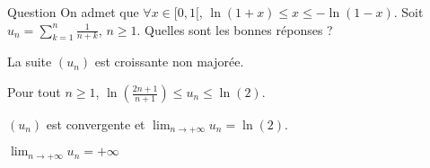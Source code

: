 \begin{multi}[multiple,feedback=
{Avec \(\displaystyle x=\frac{1}{n+k}\), on aura :
\[\ln(n+k+1)-\ln (n+k)\leq \frac{1}{n+k}\leq \ln(n+k)-\ln (n+k-1).\]
On somme sur \(k\) de \(1\) à \(n\), on obtient :
\[\ln \left(\frac{2n+1}{n+1}\right)\leq u_n\leq \ln (2n)-\ln (n)=\ln (2).\]
Le théorème d'encadrement implique que \((u_n)\) converge et que sa limite est \(\ln (2)\).
}]{Question}
On admet que \(\forall x \in [0,1[\), \(\ln (1+x)\leq x\leq -\ln (1-x)\). Soit \(\displaystyle u_n=\sum _{k=1}^n\frac{1}{n+k}\), \(n\geq 1\). Quelles sont les bonnes réponses ?

    \item La suite \((u_n)\) est croissante non majorée.
    \item* Pour tout \(n\geq 1\), \(\displaystyle \ln \left(\frac{2n+1}{n+1}\right)\leq u_n\leq \ln (2)\).
    \item* \((u_n)\) est convergente et \(\displaystyle \lim _{n\to +\infty}u_n=\ln (2)\).
    \item \(\displaystyle \lim _{n\to +\infty}u_n=+\infty\)
\end{multi}
